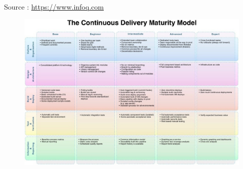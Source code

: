 \normalsize{Source : \url{https://www.infoq.com}}

\begin{figure}[ht]
	\centering
	\includegraphics[scale=0.62,angle=-90]{img/devops-matrice.jpg}
	\label{annexe:devops-matrice}
\end{figure}

